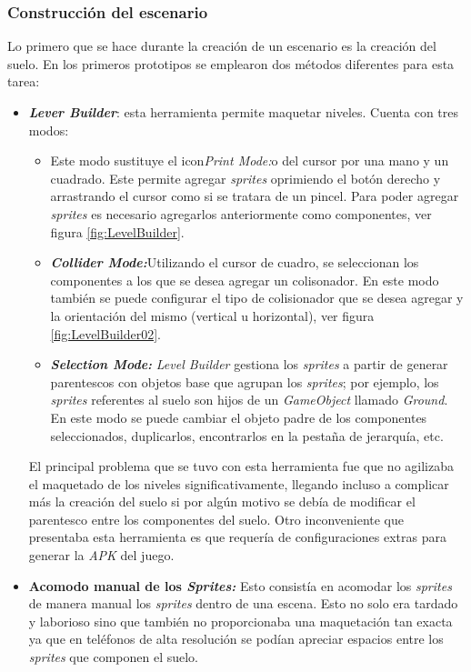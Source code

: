 \subsubsection{Construcción del escenario}  
Lo primero que se hace durante la creación de un escenario es la creación del 
suelo. En los primeros prototipos se emplearon dos métodos diferentes para esta 
tarea:  
	\begin{itemize}
		\item \textbf{\textit{Lever Builder}}: esta herramienta permite maquetar 
		niveles. Cuenta con tres modos: 
		\begin{itemize}
			\item \textbf{} Este modo sustituye el icon\textit{Print Mode:}o del 
			cursor por una mano y un cuadrado. Este permite agregar 
			\textit{sprites} oprimiendo el botón derecho y arrastrando el cursor 
			como si se tratara de un pincel. Para poder agregar \textit{sprites} 
			es necesario agregarlos anteriormente como componentes, ver figura 
			\ref{fig:LevelBuilder}.
			\item \textbf{\textit{Collider Mode:}}Utilizando el cursor de 
			cuadro, se seleccionan los componentes a los que se desea agregar un 
			colisonador. En este modo también se puede configurar el tipo de 
			colisionador que se desea agregar y la orientación del mismo 
			(vertical u horizontal), ver figura \ref{fig:LevelBuilder02}.
			\item \textbf{\textit{Selection Mode:}} \textit{Level Builder} 
			gestiona los \textit{sprites} a partir de generar parentescos con 
			objetos base que agrupan los \textit{sprites}; por ejemplo, los 
			\textit{sprites} referentes al suelo son hijos de un 
			\textit{GameObject} llamado \textit{Ground}. En este modo se puede 
			cambiar el objeto padre de los componentes seleccionados, 
			duplicarlos, encontrarlos en la pestaña de jerarquía, etc.  
		\end{itemize} 
		
		El principal problema que se tuvo con esta herramienta fue que no 
		agilizaba el maquetado de los niveles significativamente, llegando 
		incluso a complicar más la creación del suelo si por algún motivo se 
		debía de modificar el parentesco entre los componentes del suelo. Otro 
		inconveniente que presentaba esta herramienta es que requería de 
		configuraciones extras para generar la \textit{APK} del juego.
		
		\item \textbf{Acomodo manual de los \textit{Sprites:}} Esto consistía en 
		acomodar los \textit{sprites} de manera manual los \textit{sprites} 
		dentro de una escena. Esto no solo era tardado y laborioso sino que 
		también no proporcionaba una maquetación tan exacta ya que en teléfonos 
		de alta resolución se podían apreciar espacios entre los 
		\textit{sprites} que componen el suelo.
	\end{itemize}

